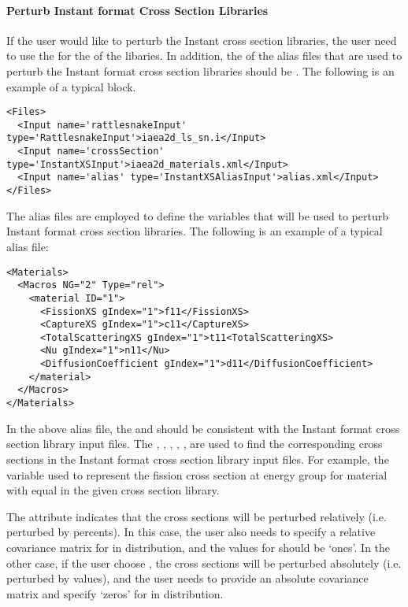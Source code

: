 \paragraph{Perturb Instant format Cross Section Libraries}
If the user would like to perturb the Instant cross section libraries, the user need to use the
 for the  of the libaries. In addition, the  of the
alias files that are used to perturb the Instant format cross section libraries should be
. The following is an example of a typical  block.
%
\begin{lstlisting}[style=XML]
<Files>
  <Input name='rattlesnakeInput' type='RattlesnakeInput'>iaea2d_ls_sn.i</Input>
  <Input name='crossSection'    type='InstantXSInput'>iaea2d_materials.xml</Input>
  <Input name='alias' type='InstantXSAliasInput'>alias.xml</Input>
</Files>
\end{lstlisting}
%
The alias files are employed to define the variables that will be used to perturb Instant format cross section
libraries. The following is an example of a typical alias file:
%
\begin{lstlisting}[style=XML]
<Materials>
  <Macros NG="2" Type="rel">
    <material ID="1">
      <FissionXS gIndex="1">f11</FissionXS>
      <CaptureXS gIndex="1">c11</CaptureXS>
      <TotalScatteringXS gIndex="1">t11<TotalScatteringXS>
      <Nu gIndex="1">n11</Nu>
      <DiffusionCoefficient gIndex="1">d11</DiffusionCoefficient>
    </material>
  </Macros>
</Materials>
\end{lstlisting}

%
In the above alias file, the  and  should be consistent with the Instant format cross
section library input files. The , , , , ,
are used to find the corresponding cross sections in the Instant format cross
section library input files. For example, the variable  used to represent the fission cross section at energy group 
for material with  equal  in the given cross section library.

\nb The attribute  indicates that the cross sections will be perturbed relatively (i.e. perturbed by
percents). In this case, the user also needs to specify a relative covariance matrix for  in
 distribution, and the values for  should be `ones'. In the other case, if
the user choose , the cross sections will be perturbed absolutely (i.e. perturbed by values), and
the user needs to provide an absolute covariance matrix and specify `zeros' for  in 
distribution.

